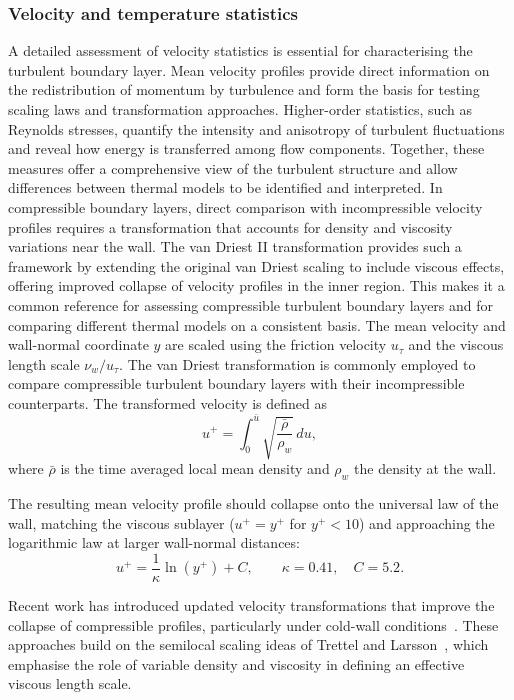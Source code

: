 \subsubsection{Velocity and temperature statistics}
A detailed assessment of velocity statistics is essential for characterising the turbulent boundary layer. Mean velocity profiles provide direct information on the redistribution of momentum by turbulence and form the basis for testing scaling laws and transformation approaches. Higher-order statistics, such as Reynolds stresses, quantify the intensity and anisotropy of turbulent fluctuations and reveal how energy is transferred among flow components. Together, these measures offer a comprehensive view of the turbulent structure and allow differences between thermal models to be identified and interpreted. In compressible boundary layers, direct comparison with incompressible velocity profiles requires a transformation that accounts for density and viscosity variations near the wall. The van Driest II transformation provides such a framework by extending the original van Driest scaling to include viscous effects, offering improved collapse of velocity profiles in the inner region. This makes it a common reference for assessing compressible turbulent boundary layers and for comparing different thermal models on a consistent basis.  The mean velocity and wall-normal coordinate $y$ are scaled using the friction velocity $u_{\tau}$ and the viscous length scale $\nu_w/u_{\tau}$. The van Driest transformation is commonly employed to compare compressible turbulent boundary layers with their incompressible counterparts. The transformed velocity is defined as  
\begin{equation}
    u^{+} = \int_{0}^{\bar{u}} \sqrt{\frac{\bar{\rho}}{\rho_w}} \, du ,
\end{equation}
where $\bar{\rho}$ is the time averaged local mean density and $\rho_w$ the density at the wall.  

The resulting mean velocity profile should collapse onto the universal law of the wall, matching the viscous sublayer ($u^{+}=y^{+}$ for $y^{+}<10$) and approaching the logarithmic law at larger wall-normal distances:
\begin{equation}
    u^{+} = \frac{1}{\kappa}\ln(y^{+}) + C, 
    \qquad \kappa = 0.41, \quad C = 5.2 .
\end{equation}

Recent work has introduced updated velocity transformations that improve the collapse of compressible profiles, particularly under cold-wall conditions~\cite{HasanEtal2023}. These approaches build on the semilocal scaling ideas of Trettel and Larsson~\cite{TrettelLarsson2016}, which emphasise the role of variable density and viscosity in defining an effective viscous length scale.

